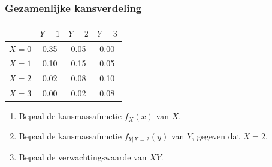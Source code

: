     \begin{frame}\frametitle{Gezamenlijke kansverdeling}
        {\small
            \begin{center}
                \begin{tabular}{c|ccc}
                    \toprule
                            & $Y=1$ & $Y=2$ & $Y=3$ \\
                    \midrule
                        $X=0$   & 0.35 & 0.05 & 0.00 \\
                        $X=1$   & 0.10 & 0.15 & 0.05 \\
                        $X=2$   & 0.02 & 0.08 & 0.10 \\
                        $X=3$   & 0.00 & 0.02 & 0.08 \\
                    \bottomrule
                \end{tabular}
            \end{center}
        }
        
        \begin{enumerate}
            \item Bepaal de kansmassafunctie $f_X(x)$ van $X$.
            \item Bepaal de kansmassafunctie $f_{Y|X=2}(y)$ van $Y$, gegeven dat $X = 2$.
            \item Bepaal de verwachtingswaarde van $XY$.
        \end{enumerate}

    \end{frame}

